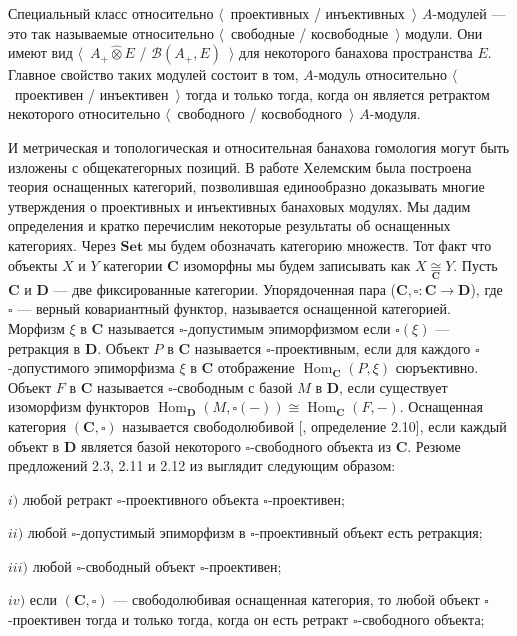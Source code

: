 \documentclass[12pt]{article}
\newcommand{\projtens}{\mathbin{\widehat{\otimes}}}
\newcommand{\isom}[1]{\mathop{\mathbin{\cong}}\limits_{#1}}
\begin{document}
Специальный класс относительно $\langle$~проективных / инъективных~$\rangle$ $A$-модулей --- это так называемые относительно $\langle$~свободные / косвободные~$\rangle$ модули. Они имеют вид $\langle$~$A_+\projtens E$ / $\mathcal{B}(A_+,E)$~$\rangle$ для некоторого банахова пространства $E$. Главное свойство таких модулей состоит в том, $A$-модуль относительно $\langle$~проективен / инъективен~$\rangle$ тогда и только тогда, когда он является ретрактом некоторого относительно $\langle$~свободного / косвободного~$\rangle$ $A$-модуля. 

И метрическая и топологическая и относительная банахова гомология могут быть изложены с общекатегорных позиций. В работе \cite{HelMetrFrQMod} Хелемским была построена теория оснащенных категорий, позволившая единообразно доказывать многие утверждения о проективных и инъективных банаховых модулях. Мы дадим определения и кратко перечислим некоторые результаты об оснащенных категориях. Через $\mathbf{Set}$ мы будем обозначать категорию множеств. Тот факт что объекты $X$ и $Y$ категории $\mathbf{C}$ изоморфны мы будем записывать как $X\isom{\mathbf{C}}Y$. Пусть $\mathbf{C}$ и $\mathbf{D}$ --- две фиксированные категории. Упорядоченная пара ($\mathbf{C}, \square:\mathbf{C}\to\mathbf{D}$), где $\square$ --- верный ковариантный функтор, называется оснащенной категорией. Морфизм $\xi$ в $\mathbf{C}$ называется $\square$-допустимым эпиморфизмом если $\square (\xi)$ --- ретракция в $\mathbf{D}$. Объект $P$ в $\mathbf{C}$ называется $\square$-проективным, если для каждого $\square$-допустимого эпиморфизма $\xi$ в $\mathbf{C}$ отображение $\operatorname{Hom}_{\mathbf{C}}(P,\xi)$ сюръективно. Объект $F$ в $\mathbf{C}$ называется $\square$-свободным с базой $M$ в  $\mathbf{D}$, если существует изоморфизм функторов $\operatorname{Hom}_{\mathbf{D}}(M,\square(-))\cong\operatorname{Hom}_{\mathbf{C}}(F,-)$. Оснащенная категория $(\mathbf{C},\square)$ называется свободолюбивой [\cite{HelMetrFrQMod}, определение 2.10], если каждый объект в $\mathbf{D}$ является базой некоторого $\square$-свободного объекта из $\mathbf{C}$. Резюме предложений 2.3, 2.11  и 2.12 из \cite{HelMetrFrQMod} выглядит следующим образом:

$i)$ любой ретракт $\square$-проективного объекта $\square$-проективен;

$ii)$ любой $\square$-допустимый эпиморфизм в $\square$-проективный объект есть ретракция;

$iii)$ любой $\square$-свободный объект $\square$-проективен;

$iv)$ если $(\mathbf{C},\square)$ --- свободолюбивая оснащенная категория, то любой объект $\square$-проективен тогда и только тогда, когда он есть ретракт $\square$-свободного объекта;
\end{document}
